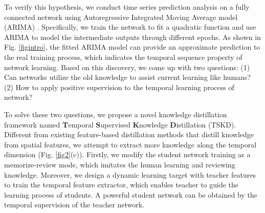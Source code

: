 \documentclass[letterpaper]{article} %
\begin{document}

To verify this hypothesis, we conduct time series prediction analysis on a fully connected network using Autoregressive Integrated Moving Average model (ARIMA) \cite{box1970distribution}. Specifically, we train the network to fit a quadratic function and use ARIMA to model the intermediate outputs through different epochs. As shown in Fig. \ref{figintro}, the fitted ARIMA model can provide an approximate prediction to the real training process, which indicates the temporal sequence property of network learning. Based on this discovery, we come up with two questions: (1) Can networks utilize the old knowledge to assist current learning like humans? (2) How to apply positive supervision to the temporal learning process of network? 



To solve these two questions, we propose a novel knowledge distillation framework named \textbf{T}emporal \textbf{S}upervised \textbf{K}nowledge \textbf{D}istillation (TSKD). Different from existing feature-based distillation methods that distill knowledge from spatial features, we attempt to extract more knowledge along the temporal dimension (Fig. \ref{fig2}(c)). Firstly, we modify the student network training as a memorize-review mode, which imitates the human learning and reviewing knowledge. Moreover, we design a dynamic learning target with teacher features to train the temporal feature extractor, which enables teacher to guide the learning process of students. A powerful student network can be obtained by the temporal supervision of the teacher network.
\end{document}
